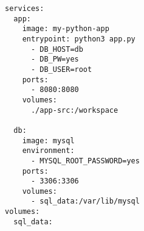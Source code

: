 
\begin{lstlisting}[language=docker-compose-2,caption={Exemplary Python Project \code{docker-compose.yml}},breaklines=true,label={code::compose_example}]
services:
  app:
    image: my-python-app
    entrypoint: python3 app.py
      - DB_HOST=db
      - DB_PW=yes
      - DB_USER=root
    ports:
      - 8080:8080
    volumes:
      ./app-src:/workspace

  db:
    image: mysql
    environment:
      - MYSQL_ROOT_PASSWORD=yes
    ports:
      - 3306:3306
    volumes:
      - sql_data:/var/lib/mysql
volumes:
  sql_data:
\end{lstlisting}
